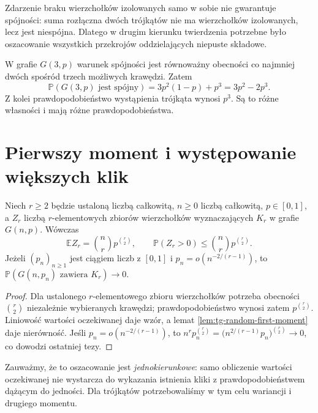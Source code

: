 \begin{uwaga}
Zdarzenie braku wierzchołków
izolowanych samo w sobie
nie gwarantuje spójności:
suma rozłączna dwóch
trójkątów nie ma
wierzchołków izolowanych,
lecz jest niespójna.
Dlatego w drugim
kierunku twierdzenia
potrzebne było
oszacowanie wszystkich
przekrojów oddzielających
niepuste składowe.
\end{uwaga}

\begin{przyklad}
\label{ex:tg-random-three-connect}
W grafie $G(3,p)$
warunek spójności
jest równoważny
obecności co najmniej
dwóch spośród trzech
możliwych krawędzi.
Zatem
\[
\mathbb P(G(3,p)\text{ jest spójny})
=3p^2(1-p)+p^3=3p^2-2p^3.
\]
Z kolei prawdopodobieństwo
wystąpienia trójkąta
wynosi $p^3$.
Są to różne własności
i mają różne
prawdopodobieństwa.
\end{przyklad}

\section{Pierwszy moment i występowanie większych klik}
\label{sec:tg-random-cliques}

\begin{stwierdzenie}
\label{prop:tg-random-cliques}
Niech $r\geq2$ będzie ustaloną liczbą całkowitą,
$n\geq0$ liczbą całkowitą, $p\in[0,1]$, a $Z_r$
liczbą $r$-elementowych
zbiorów wierzchołków
wyznaczających $K_r$
w grafie $G(n,p)$.
Wówczas
\[
\mathbb EZ_r=
\binom nr p^{\binom r2},
\qquad
\mathbb P(Z_r>0)
\leq\binom nr p^{\binom r2}.
\]
Jeżeli $(p_n)_{n\geq1}$ jest ciągiem liczb z $[0,1]$
i $p_n=o(n^{-2/(r-1)})$,
to
$\mathbb P(G(n,p_n)
\text{ zawiera }K_r)\to0$.
\end{stwierdzenie}
\begin{proof}
Dla ustalonego
$r$-elementowego
zbioru wierzchołków
potrzeba obecności
$\binom r2$ niezależnie
wybieranych krawędzi;
prawdopodobieństwo
wynosi zatem
$p^{\binom r2}$.
Liniowość wartości
oczekiwanej daje wzór,
a lemat
\ref{lem:tg-random-first-moment}
daje nierówność.
Jeśli
$p_n=o(n^{-2/(r-1)})$,
to
$n^rp_n^{\binom r2}
=\bigl(n^{2/(r-1)}p_n\bigr)^{\binom r2}
\to0$, co dowodzi
ostatniej tezy.
\end{proof}

Zauważmy, że to
oszacowanie jest
\emph{jednokierunkowe}:
samo obliczenie
wartości oczekiwanej
nie wystarcza
do wykazania istnienia
kliki z prawdopodobieństwem
dążącym do jedności.
Dla trójkątów
potrzebowaliśmy
w tym celu
wariancji i
drugiego momentu.

